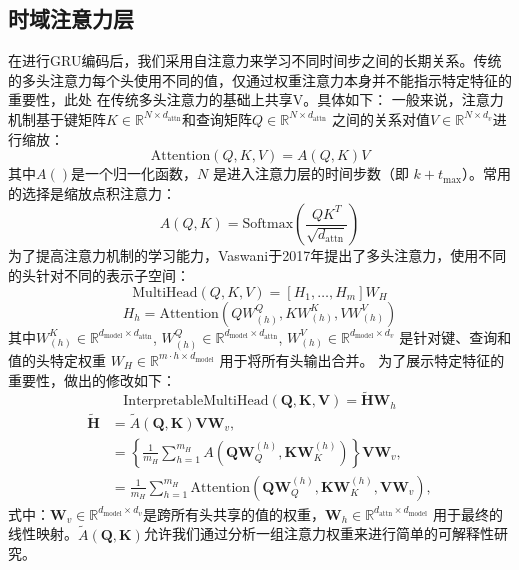 \subsection{时域注意力层}
在进行GRU编码后，我们采用自注意力来学习不同时间步之间的长期关系。传统的多头注意力每个头使用不同的值，仅通过权重注意力本身并不能指示特定特征的重要性，此处
在传统多头注意力的基础上共享V。具体如下：
一般来说，注意力机制基于键矩阵\( K \in \mathbb{R}^{N \times d_{\text{attn}}} \)和查询矩阵\( Q \in \mathbb{R}^{N \times d_{\text{attn}}} \)
之间的关系对值\( V \in \mathbb{R}^{N \times d_v} \)进行缩放：
\begin{equation}
    \text{Attention}(Q, K, V) = A(Q,K)V
\end{equation}
其中$A()$是一个归一化函数，\( N \) 是进入注意力层的时间步数（即 \( k + t_{\text{max}} \)）。常用的选择是缩放点积注意力：
\begin{equation}
    A(Q, K) = \text{Softmax}\left(\frac{QK^T}{\sqrt{d_{\text{attn}}}}\right)
\end{equation}
为了提高注意力机制的学习能力，Vaswani于2017年提出了多头注意力，使用不同的头针对不同的表示子空间：
\begin{equation}
    \text{MultiHead}(Q, K, V) = [H_1, \ldots, H_m]W_H
\end{equation}
\begin{equation}
    H_h = \text{Attention}(QW^Q_{(h)}, KW^K_{(h)}, VW^V_{(h)})
\end{equation}
其中\( W^K_{(h)} \in \mathbb{R}^{d_{\text{model}} \times d_{\text{attn}}} \), \( W^Q_{(h)} \in \mathbb{R}^{d_{\text{model}} \times d_{\text{attn}}} \), \( W^V_{(h)} \in \mathbb{R}^{d_{\text{model}} \times d_v} \) 
是针对键、查询和值的头特定权重 \( W_H \in \mathbb{R}^{m \cdot h \times d_{\text{model}}} \) 用于将所有头输出合并。
为了展示特定特征的重要性，做出的修改如下：
\begin{equation}
    \text{InterpretableMultiHead}(\mathbf{Q}, \mathbf{K}, \mathbf{V}) = \tilde{\mathbf{H}} \mathbf{W}_h
\end{equation}
\begin{equation}
    \begin{aligned}
        \mathbf{\tilde{H}} &= \tilde{A}(\mathbf{Q}, \mathbf{K}) \mathbf{V} \mathbf{W}_v, \\
        &= \left\{ \frac{1}{m_H} \sum_{h=1}^{m_H} A(\mathbf{Q} \mathbf{W}_Q^{(h)}, \mathbf{K} \mathbf{W}_K^{(h)}) \right\} \mathbf{V} \mathbf{W}_v, \\
        &= \frac{1}{m_H} \sum_{h=1}^{m_H} \text{Attention}(\mathbf{Q} \mathbf{W}_Q^{(h)}, \mathbf{K} \mathbf{W}_K^{(h)}, \mathbf{V} \mathbf{W}_v),
    \end{aligned}        
\end{equation}
式中：$\mathbf{W}_v \in \mathbb{R}^{d_{\text{model}} \times d_v}$是跨所有头共享的值的权重，$\mathbf{W}_h \in \mathbb{R}^{d_{\text{attn}} \times d_{\text{model}}}$
用于最终的线性映射。$\tilde{A}(\mathbf{Q}, \mathbf{K})$允许我们通过分析一组注意力权重来进行简单的可解释性研究。

